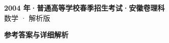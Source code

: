\documentclass[zihao=-4, a4paper]{ctexart}
\begin{document}
\begin{center}
  {\Large\bfseries 2004 年·普通高等学校春季招生考试·安徽卷理科}\\[4pt]
  {\large 数学 · 解析版}
\end{center}
\medskip
{}

\clearpage
{}
\begin{center}{\Large\bfseries 参考答案与详细解析}\end{center}
\medskip

\end{document}

